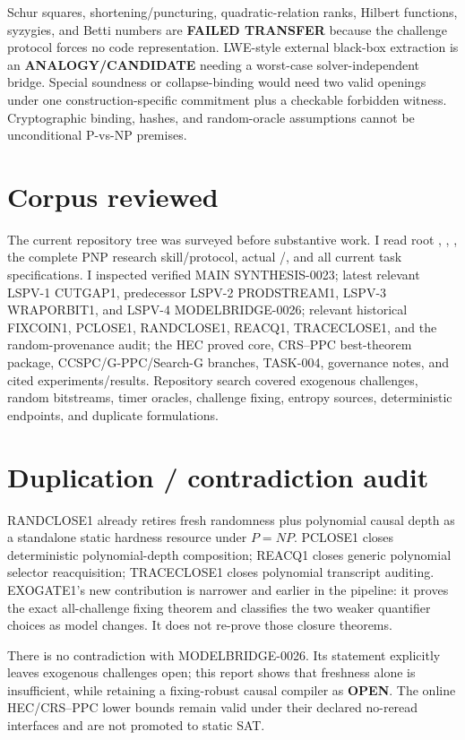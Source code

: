 \documentclass[11pt]{article}
\newcommand{\OPEN}{\textbf{OPEN}}
\begin{document}
Schur squares, shortening/puncturing, quadratic-relation ranks, Hilbert
functions, syzygies, and Betti numbers are \textbf{FAILED TRANSFER} because
the challenge protocol forces no code representation.  LWE-style external
black-box extraction is an \textbf{ANALOGY/CANDIDATE} needing a worst-case
solver-independent bridge.  Special soundness or collapse-binding would need
two valid openings under one construction-specific commitment plus a
checkable forbidden witness.  Cryptographic binding, hashes, and random-oracle
assumptions cannot be unconditional P-vs-NP premises.

\section{Corpus reviewed}

The current repository tree was surveyed before substantive work.  I read
root , , , the complete PNP
research skill/protocol, actual /, and all
current task specifications.  I inspected verified MAIN SYNTHESIS-0023;
latest relevant LSPV-1 CUTGAP1, predecessor LSPV-2 PRODSTREAM1, LSPV-3
WRAPORBIT1, and LSPV-4 MODELBRIDGE-0026; relevant historical FIXCOIN1,
PCLOSE1, RANDCLOSE1, REACQ1, TRACECLOSE1, and the random-provenance audit;
the HEC proved core, CRS--PPC best-theorem package, CCSPC/G-PPC/Search-G
branches, TASK-004, governance notes, and cited experiments/results.
Repository search covered exogenous challenges, random bitstreams, timer
oracles, challenge fixing, entropy sources, deterministic endpoints, and
duplicate formulations.

\section{Duplication / contradiction audit}

RANDCLOSE1 already retires fresh randomness plus polynomial causal depth as a
standalone static hardness resource under $P=NP$.  PCLOSE1 closes deterministic
polynomial-depth composition; REACQ1 closes generic polynomial selector
reacquisition; TRACECLOSE1 closes polynomial transcript auditing.  EXOGATE1's
new contribution is narrower and earlier in the pipeline: it proves the exact
all-challenge fixing theorem and classifies the two weaker quantifier choices
as model changes.  It does not re-prove those closure theorems.

There is no contradiction with MODELBRIDGE-0026.  Its statement explicitly
leaves exogenous challenges open; this report shows that freshness alone is
insufficient, while retaining a fixing-robust causal compiler as \OPEN.  The
online HEC/CRS--PPC lower bounds remain valid under their declared no-reread
interfaces and are not promoted to static SAT.
\end{document}
